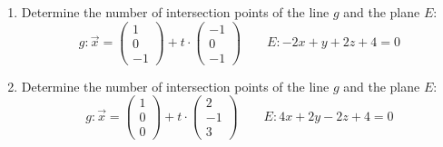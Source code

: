 \documentclass[12pt,eng]{skript_ogg}
\begin{document}
\begin{uebung}
\begin{enumerate}[\bfseries 1.]
	\item Determine the number of intersection points of the line $g$ and the plane $E$:
\[g:\vec{x}=\begin{pmatrix}1\\0\\-1\end{pmatrix}+t\cdot \begin{pmatrix}-1\\0\\-1\end{pmatrix}\qquad E:-2x+y+2z+4=0\]

\vspace{6cm}

	\item Determine the number of intersection points of the line $g$ and the plane $E$:
\[g:\vec{x}=\begin{pmatrix}1\\0\\0\end{pmatrix}+t\cdot \begin{pmatrix}2\\-1\\3\end{pmatrix}\qquad E:4x+2y-2z+4=0\]

\vspace{6cm}

\end{enumerate}
\end{uebung}
\end{document}
